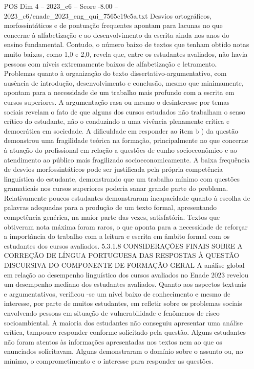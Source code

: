 \begin{textsample}{POS Dim 4 – 2023\_c6 – Score -8.00 – 2023\_c6/enade\_2023\_eng\_qui\_7565c19e5a.txt}
Desvios ortográficos, morfossintáticos e de pontuação frequentes apontam para lacunas no que concerne à alfabetização e ao desenvolvimento da escrita ainda nos anos do ensino fundamental.
Contudo, o número baixo de textos que tenham obtido notas muito baixas, como 1,0 e 2,0, revela que, entre os estudantes avaliados, não havia pessoas com níveis extremamente baixos de alfabetização e letramento.
Problemas quanto à organização do texto dissertativo-argumentativo, com ausência de introdução, desenvolvimento e conclusão, mesmo que minimamente, apontam para a necessidade de um trabalho mais profundo com a escrita em cursos superiores.
A argumentação rasa ou mesmo o desinteresse por temas sociais revelam o fato de que alguns dos cursos estudados não trabalham o senso crítico do estudante, não o conduzindo a uma vivência plenamente crítica e democrática em sociedade.
A dificuldade em responder ao item b ) da questão demonstrou uma fragilidade teórica na formação, principalmente no que concerne à atuação do profissional em relação a questões de cunho socioeconômico e ao atendimento ao público mais fragilizado socioeconomicamente.
A baixa frequência de desvios morfossintáticos pode ser justificada pela própria competência linguística do estudante, demonstrando que um trabalho mínimo com questões gramaticais nos cursos superiores poderia sanar grande parte do problema.
Relativamente poucos estudantes demonstraram incapacidade quanto à escolha de palavras adequadas para a produção de um texto formal, apresentando competência genérica, na maior parte das vezes, satisfatória.
Textos que obtiveram nota máxima foram raros, o que aponta para a necessidade de reforçar a importância do trabalho com a leitura e escrita em âmbito formal com os estudantes dos cursos avaliados. 5.3.1.8 CONSIDERAÇÕES FINAIS SOBRE A CORREÇÃO DE LÍNGUA PORTUGUESA DAS RESPOSTAS À QUESTÃO DISCURSIVA DO COMPONENTE DE FORMAÇÃO GERAL A análise global em relação ao desempenho linguístico dos cursos avaliados no Enade 2023 revelou um desempenho mediano dos estudantes avaliados.
Quanto aos aspectos textuais e argumentativos, verificou -se um nível baixo de conhecimento e mesmo de interesse, por parte de muitos estudantes, em refletir sobre os problemas sociais envolvendo pessoas em situação de vulnerabilidade e fenômenos de risco socioambiental.
A maioria dos estudantes não conseguiu apresentar uma análise crítica, tampouco responder conforme solicitado pela questão.
Alguns estudantes não foram atentos às informações apresentadas nos textos nem ao que os enunciados solicitavam.
Alguns demonstraram o domínio sobre o assunto ou, no mínimo, o comprometimento e o interesse para responder as questões.

\end{textsample}
